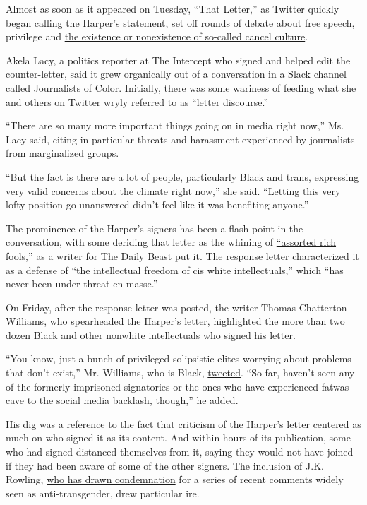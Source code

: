 Almost as soon as it appeared on Tuesday, ``That Letter,'' as Twitter
quickly began calling the Harper's statement, set off rounds of debate
about free speech, privilege and
\href{https://www.vox.com/culture/2019/12/30/20879720/what-is-cancel-culture-explained-history-debate}{the
existence or nonexistence of so-called cancel culture}.

Akela Lacy, a politics reporter at The Intercept who signed and helped
edit the counter-letter, said it grew organically out of a conversation
in a Slack channel called Journalists of Color. Initially, there was
some wariness of feeding what she and others on Twitter wryly referred
to as ``letter discourse.''

``There are so many more important things going on in media right now,''
Ms. Lacy said, citing in particular threats and harassment experienced
by journalists from marginalized groups.

``But the fact is there are a lot of people, particularly Black and
trans, expressing very valid concerns about the climate right now,'' she
said. ``Letting this very lofty position go unanswered didn't feel like
it was benefiting anyone.''

The prominence of the Harper's signers has been a flash point in the
conversation, with some deriding that letter as the whining of
\href{https://www.thedailybeast.com/jk-rowling-and-other-assorted-rich-fools-want-to-cancel-cancel-culture}{``assorted
rich fools,''} as a writer for The Daily Beast put it. The response
letter characterized it as a defense of ``the intellectual freedom of
cis white intellectuals,'' which ``has never been under threat en
masse.''

On Friday, after the response letter was posted, the writer Thomas
Chatterton Williams, who spearheaded the Harper's letter, highlighted
the
\href{https://twitter.com/thomaschattwill/status/1281598079490297861?s=20}{more
than two dozen} Black and other nonwhite intellectuals who signed his
letter.

``You know, just a bunch of privileged solipsistic elites worrying about
problems that don't exist,'' Mr. Williams, who is Black,
\href{https://twitter.com/thomaschattwill/status/1281648311389184000?s=20}{tweeted}.
``So far, haven't seen any of the formerly imprisoned signatories or the
ones who have experienced fatwas cave to the social media backlash,
though,'' he added.

His dig was a reference to the fact that criticism of the Harper's
letter centered as much on who signed it as its content. And within
hours of its publication, some who had signed distanced themselves from
it, saying they would not have joined if they had been aware of some of
the other signers. The inclusion of J.K. Rowling,
\href{https://www.nytimes.com/2020/06/12/style/jk-rowling-transgender-fans.html}{who
has drawn condemnation} for a series of recent comments widely seen as
anti-transgender, drew particular ire.

